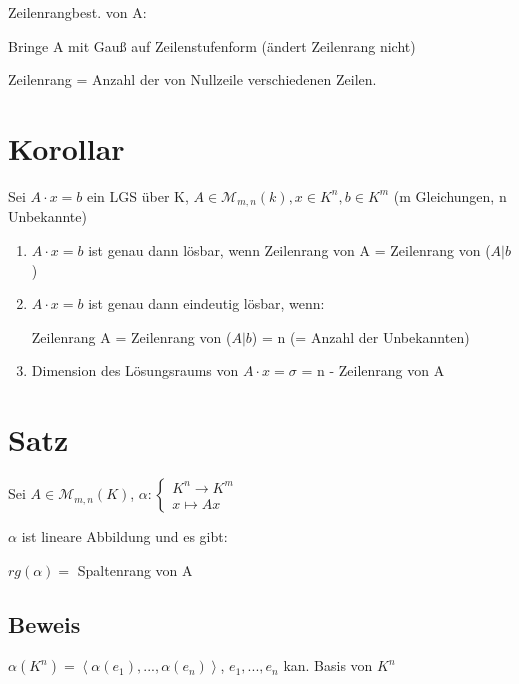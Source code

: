 \documentclass[a4paper, openany]{book}
\begin{document}
        Zeilenrangbest. von A: 

        Bringe A mit Gauß auf Zeilenstufenform (ändert Zeilenrang nicht)

        Zeilenrang = Anzahl der von Nullzeile verschiedenen Zeilen.

        \section{Korollar}

        Sei $A \cdot x = b$ ein LGS über K, $A \in \mathcal{M}_{m,n}(k), x \in K^n, b \in K^m$ (m Gleichungen, n Unbekannte)

        \begin{enumerate}[label=(\alph*)]
          \item $A \cdot x = b$ ist genau dann lösbar, wenn Zeilenrang von A = Zeilenrang von ($A|b$)

          \item $A \cdot x = b$ ist genau dann eindeutig lösbar, wenn:

          Zeilenrang A = Zeilenrang von ($A|b$) = n (= Anzahl der Unbekannten)

          \item Dimension des Lösungsraums von $A \cdot x = \sigma$ = n - Zeilenrang von A
        \end{enumerate}

        \section{Satz}

        Sei $A \in \mathcal{M}_{m,n} (K)$, $\alpha: \begin{cases}K^n \rightarrow K^m \\ x \mapsto Ax \end{cases}$

        $\alpha$ ist lineare Abbildung und es gibt:

        \begin{center} 
          $rg(\alpha) = $ Spaltenrang von A
        \end{center}

        \subsection{Beweis}

        $\alpha(K^n) = \left \langle \alpha(e_1), ..., \alpha(e_n) \right \rangle$, $e_1, ..., e_n$ kan. Basis von $K^n$
\end{document}

